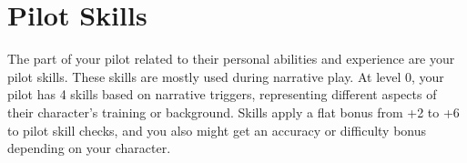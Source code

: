 \section{Pilot Skills}

The part of your pilot related to their personal abilities and experience are your pilot skills. These
skills are mostly used during narrative play. At level 0, your pilot has 4 skills based on narrative
triggers, representing different aspects of their character’s training or background. Skills apply a
flat bonus from +2 to +6 to pilot skill checks, and you also might get an accuracy or difficulty
bonus depending on your character.